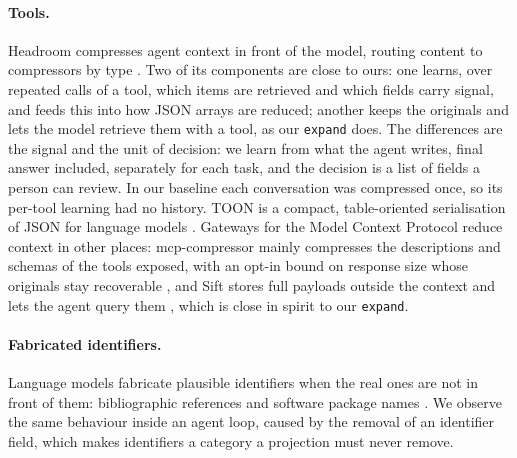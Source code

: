 \paragraph{Tools.} Headroom compresses agent context in front of the model, routing content to compressors by type
\citep{headroom2026}. Two of its components are close to ours: one learns, over repeated calls of a tool, which items
are retrieved and which fields carry signal, and feeds this into how JSON arrays are reduced; another keeps the
originals and lets the model retrieve them with a tool, as our \texttt{expand} does. The differences are the signal
and the unit of decision: we learn from what the agent writes, final answer included, separately for each task, and
the decision is a list of fields a person can review. In our baseline each conversation was compressed once, so its
per-tool learning had no history. TOON is a compact, table-oriented serialisation of JSON for language models
\citep{schopplich2026toon}. Gateways for the Model Context Protocol reduce context in other places: mcp-compressor
mainly compresses the descriptions and schemas of the tools exposed, with an opt-in bound on response size whose
originals stay recoverable \citep{atlassian2026mcpcompressor}, and Sift stores full payloads outside the context and
lets the agent query them \citep{sift2026gateway}, which is close in spirit to our \texttt{expand}.

\paragraph{Fabricated identifiers.} Language models fabricate plausible identifiers when the real ones are not in
front of them: bibliographic references \citep{walters2023fabrication} and software package names
\citep{spracklen2025package}. We observe the same behaviour inside an agent loop, caused by the removal of an
identifier field, which makes identifiers a category a projection must never remove.

